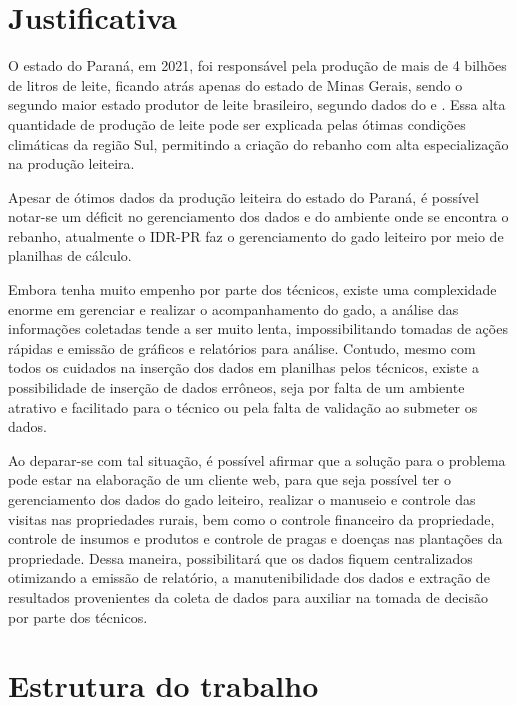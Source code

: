 \section{Justificativa}\label{sec:justificativa}

O estado do Paraná, em 2021, foi responsável pela produção de mais de 4 bilhões de litros de leite, ficando atrás apenas do estado de Minas Gerais, sendo o segundo maior estado produtor de leite brasileiro, segundo dados do  e . Essa alta quantidade de produção de leite pode ser explicada pelas ótimas condições climáticas da região Sul, permitindo a criação do rebanho com alta especialização na produção leiteira.

Apesar de ótimos dados da produção leiteira do estado do Paraná, é possível notar-se um déficit no gerenciamento dos dados e do ambiente onde se encontra o rebanho, atualmente o \gls{IDR-PR} faz o gerenciamento do gado leiteiro por meio de planilhas de cálculo.

Embora tenha muito empenho por parte dos técnicos, existe uma complexidade enorme em gerenciar e realizar o acompanhamento do gado, a análise das informações coletadas tende a ser muito lenta, impossibilitando tomadas de ações rápidas e emissão de gráficos e relatórios para análise. Contudo, mesmo com todos os cuidados na inserção dos dados em planilhas pelos técnicos, existe a possibilidade de inserção de dados errôneos, seja por falta de um ambiente atrativo e facilitado para o técnico ou pela falta de validação ao submeter os dados.

Ao deparar-se com tal situação, é possível afirmar que a solução para o problema pode estar na elaboração de um cliente web, para que seja possível ter o gerenciamento dos dados do gado leiteiro, realizar o manuseio e controle das visitas nas propriedades rurais, bem como o controle financeiro da propriedade, controle de insumos e produtos e controle de pragas e doenças nas plantações da propriedade. Dessa maneira, possibilitará que os dados fiquem centralizados otimizando a emissão de relatório, a manutenibilidade dos dados e extração de resultados provenientes da coleta de dados para auxiliar na tomada de decisão por parte dos técnicos.


\section{Estrutura do trabalho}\label{sec:estruturaTrabalho}

